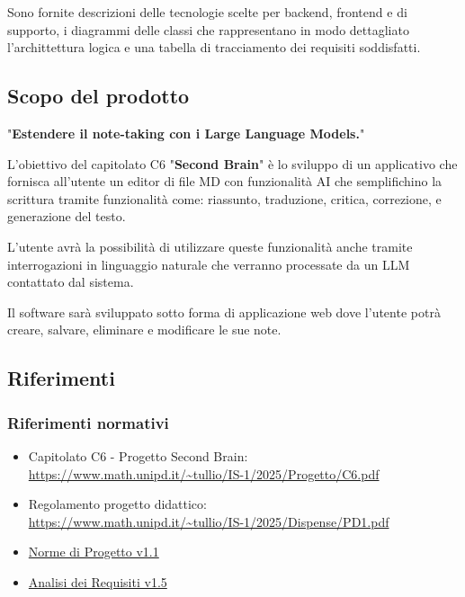 \documentclass[a4paper,10pt]{article}
\begin{document}
Sono fornite descrizioni delle tecnologie scelte per backend, frontend e di supporto, i diagrammi delle classi che rappresentano in modo dettagliato l'archittettura logica e una tabella di tracciamento dei requisiti soddisfatti.

\subsection{Scopo del prodotto}
"\textbf{Estendere il note-taking con i Large Language Models.}"

L'obiettivo del capitolato C6 "\textbf{Second Brain}" è lo sviluppo di un applicativo che fornisca all'utente un editor di file MD con funzionalità AI che semplifichino la scrittura tramite funzionalità come: riassunto, traduzione, critica, correzione, e generazione del testo.

L'utente avrà la possibilità di utilizzare queste funzionalità anche tramite interrogazioni in linguaggio naturale che verranno processate da un LLM contattato dal sistema.

Il software sarà sviluppato sotto forma di applicazione web dove l'utente potrà creare, salvare, eliminare e modificare le sue note.

\subsection{Riferimenti}
\subsubsection{Riferimenti normativi}
\begin{itemize}
  \item Capitolato C6 - Progetto Second Brain: \\  \url{https://www.math.unipd.it/~tullio/IS-1/2025/Progetto/C6.pdf}
  \item Regolamento progetto didattico: \\ \url{https://www.math.unipd.it/~tullio/IS-1/2025/Dispense/PD1.pdf}
  \item \href{https://tool-8.github.io/Documentazione-SWE/pb/Norme_di_Progetto_v1.1.pdf}{Norme di Progetto v1.1}
  \item \href{https://tool-8.github.io/Documentazione-SWE/pb/Analisi_dei_Requisiti_v1.5.pdf}{Analisi dei Requisiti v1.5}
\end{itemize}
\end{document}
